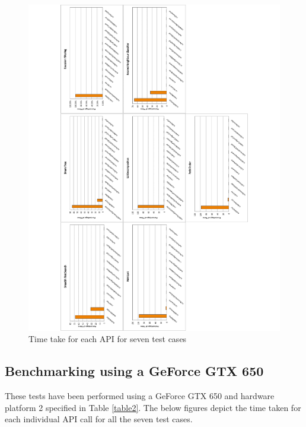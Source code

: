 \documentclass[paper=a4, fontsize=11pt]{scrartcl}
\numberwithin{equation}{section}		%
\numberwithin{figure}{section}			%
\numberwithin{table}{section}				%
\begin{document}
\begin{figure}[!h]
\centering
\includegraphics[scale=0.6]{../imgs/x630.pdf}
\caption{Time take for each API for seven test cases}
\label{fig:x630}
\end{figure}

\newpage
\subsection{Benchmarking using a GeForce GTX 650}
These tests have been performed using a GeForce GTX 650 and hardware platform 2 specified in Table \ref{table2}. The below figures depict the time taken for each individual API call for all the seven test cases.
\end{document}
